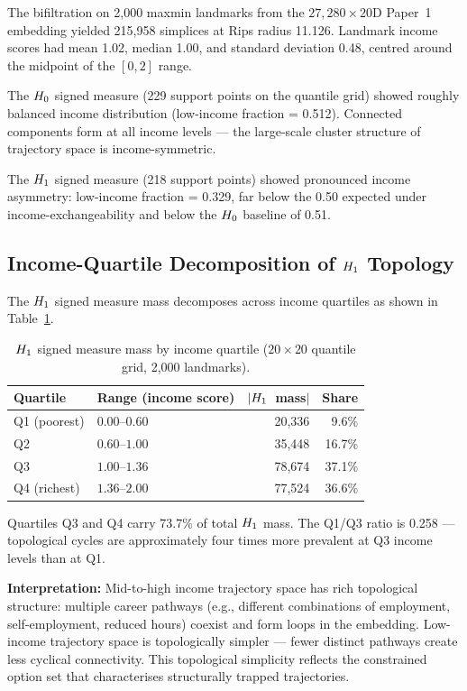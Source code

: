 The bifiltration on 2,000 maxmin landmarks from the $27{,}280 \times 20$D
Paper~1 embedding yielded 215,958 simplices at Rips radius 11.126. Landmark
income scores had mean 1.02, median 1.00, and standard deviation 0.48,
centred around the midpoint of the $[0, 2]$ range.

The $H_{0}$ signed measure (229 support points on the quantile grid) showed
roughly balanced income distribution (low-income fraction = 0.512). Connected
components form at all income levels --- the large-scale cluster structure of
trajectory space is income-symmetric.

The $H_{1}$ signed measure (218 support points) showed pronounced income
asymmetry: low-income fraction = 0.329, far below the 0.50 expected under
income-exchangeability and below the $H_{0}$ baseline of 0.51.

\subsection{Income-Quartile Decomposition of $H_{1}$ Topology}

The $H_{1}$ signed measure mass decomposes across income quartiles as shown
in Table~\ref{tab:quartile}.

\begin{table}[h]
\centering
\caption{$H_{1}$ signed measure mass by income quartile ($20 \times 20$
  quantile grid, 2,000 landmarks).}
\label{tab:quartile}
\begin{tabular}{llrr}
  \toprule
  Quartile & Range (income score) & $|H_{1}$~mass$|$ & Share \\
  \midrule
  Q1 (poorest) & $0.00$--$0.60$ & 20,336  &  9.6\% \\
  Q2           & $0.60$--$1.00$ & 35,448  & 16.7\% \\
  Q3           & $1.00$--$1.36$ & 78,674  & 37.1\% \\
  Q4 (richest) & $1.36$--$2.00$ & 77,524  & 36.6\% \\
  \bottomrule
\end{tabular}
\end{table}

Quartiles Q3 and Q4 carry 73.7\% of total $H_{1}$ mass. The Q1/Q3 ratio is
0.258 --- topological cycles are approximately four times more prevalent at
Q3 income levels than at Q1.

\textbf{Interpretation:} Mid-to-high income trajectory space has rich
topological structure: multiple career pathways (e.g., different combinations
of employment, self-employment, reduced hours) coexist and form loops in the
embedding. Low-income trajectory space is topologically simpler --- fewer
distinct pathways create less cyclical connectivity. This topological
simplicity reflects the constrained option set that characterises
structurally trapped trajectories.

